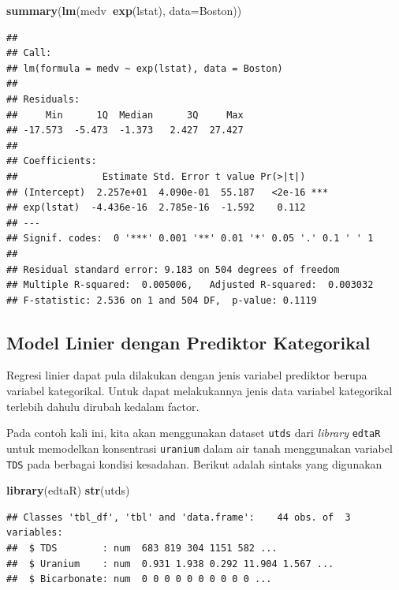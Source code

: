 \documentclass[]{book}
\newenvironment{Shaded}{\begin{snugshade}}{\end{snugshade}}
\newcommand{\DataTypeTok}[1]{\textcolor[rgb]{0.13,0.29,0.53}{#1}}
\newcommand{\KeywordTok}[1]{\textcolor[rgb]{0.13,0.29,0.53}{\textbf{#1}}}
\newcommand{\NormalTok}[1]{#1}
\newcommand{\OperatorTok}[1]{\textcolor[rgb]{0.81,0.36,0.00}{\textbf{#1}}}
\theoremstyle{definition}
\theoremstyle{definition}
\theoremstyle{definition}
\theoremstyle{remark}
\begin{document}
\begin{Shaded}
\begin{Highlighting}[]
\KeywordTok{summary}\NormalTok{(}\KeywordTok{lm}\NormalTok{(medv}\OperatorTok{~}\KeywordTok{exp}\NormalTok{(lstat), }\DataTypeTok{data=}\NormalTok{Boston))}
\end{Highlighting}
\end{Shaded}

\begin{verbatim}
## 
## Call:
## lm(formula = medv ~ exp(lstat), data = Boston)
## 
## Residuals:
##     Min      1Q  Median      3Q     Max 
## -17.573  -5.473  -1.373   2.427  27.427 
## 
## Coefficients:
##               Estimate Std. Error t value Pr(>|t|)    
## (Intercept)  2.257e+01  4.090e-01  55.187   <2e-16 ***
## exp(lstat)  -4.436e-16  2.785e-16  -1.592    0.112    
## ---
## Signif. codes:  0 '***' 0.001 '**' 0.01 '*' 0.05 '.' 0.1 ' ' 1
## 
## Residual standard error: 9.183 on 504 degrees of freedom
## Multiple R-squared:  0.005006,   Adjusted R-squared:  0.003032 
## F-statistic: 2.536 on 1 and 504 DF,  p-value: 0.1119
\end{verbatim}

\hypertarget{model-linier-dengan-prediktor-kategorikal}{%
\subsection{Model Linier dengan Prediktor Kategorikal}\label{model-linier-dengan-prediktor-kategorikal}}

Regresi linier dapat pula dilakukan dengan jenis variabel prediktor berupa variabel kategorikal. Untuk dapat melakukannya jenis data variabel kategorikal terlebih dahulu dirubah kedalam factor.

Pada contoh kali ini, kita akan menggunakan dataset \texttt{utds} dari \emph{library} \texttt{edtaR} untuk memodelkan konsentrasi \texttt{uranium} dalam air tanah menggunakan variabel \texttt{TDS} pada berbagai kondisi kesadahan. Berikut adalah sintaks yang digunakan

\begin{Shaded}
\begin{Highlighting}[]
\KeywordTok{library}\NormalTok{(edtaR)}
\KeywordTok{str}\NormalTok{(utds)}
\end{Highlighting}
\end{Shaded}

\begin{verbatim}
## Classes 'tbl_df', 'tbl' and 'data.frame':    44 obs. of  3 variables:
##  $ TDS        : num  683 819 304 1151 582 ...
##  $ Uranium    : num  0.931 1.938 0.292 11.904 1.567 ...
##  $ Bicarbonate: num  0 0 0 0 0 0 0 0 0 0 ...
\end{verbatim}
\end{document}
